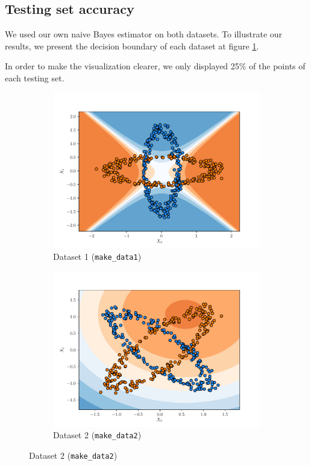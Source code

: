 \subsection{Testing set accuracy}
We used our own naive Bayes estimator on both datasets. To illustrate our results, we present the decision boundary of each dataset at figure \ref{fig:gnb}.\par
In order to make the visualization clearer, we only displayed \num{25}\% of the points of each testing set.
\begin{figure}[H]
    \centering
    \begin{subfigure}{0.495\textwidth}
        \includegraphics[width=\textwidth]{resources/pdf/make_data1_gnb.pdf}
        \caption{Dataset 1 (\texttt{make\_data1})}
    \end{subfigure}
    \begin{subfigure}{0.495\textwidth}
        \includegraphics[width=\textwidth]{resources/pdf/make_data2_gnb.pdf}
        \caption{Dataset 2 (\texttt{make\_data2})}
    \end{subfigure}
    \label{fig:gnb}
\end{figure}
